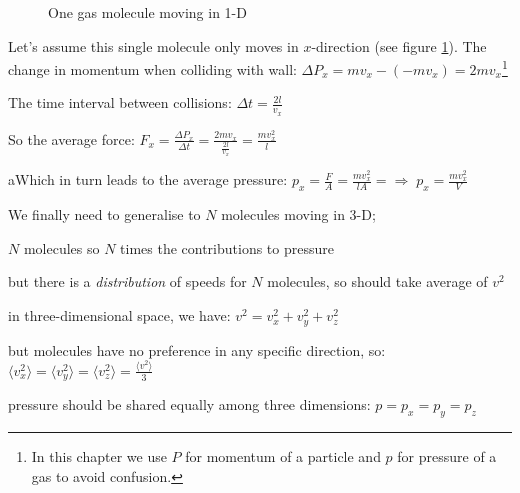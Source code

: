 \documentclass[a4paper,12pt]{book}
\newcommand{\avg}[1]{\langle#1\rangle}
\newcommand{\RA}{\Rightarrow\;}
\begin{document}
\begin{figure}[ht]
\centering
{}

\caption{One gas molecule moving in 1-D}
\label{onedmol}
\end{figure}

Let's assume this single molecule only moves in $x$-direction (see figure \ref{onedmol}). The change in momentum when colliding with wall: $\Delta P_x = mv_x - (-mv_x) = 2mv_x$\footnote{In this chapter we use $P$ for momentum of a particle and $p$ for pressure of a gas to avoid confusion.}

The time interval between collisions: $\Delta t=\frac{2l}{v_x}$

So the average force: $F_x=\frac{\Delta P_x}{\Delta t} = \frac{2mv_x}{\tfrac{2l}{v_x}} = \frac{mv_x^2}{l}$

aWhich in turn leads to the average pressure: $p_x=\frac{F}{A} = \frac{mv_x^2}{lA} = \RA p_x = \frac{mv_x^2}{V}$

We finally need to generalise to $N$ molecules moving in 3-D;

\begin{compactitem}
	\item[--] $N$ molecules so $N$ times the contributions to pressure
	
	but there is a \emph{distribution} of speeds for $N$ molecules, so should take average of $v^2$
	
	\item[--] in three-dimensional space, we have: $v^2=v_x^2 + v_y^2 + v_z^2$
	
	but molecules have no preference in any specific direction, so: $\avg{v_x^2} = \avg{v_y^2} = \avg{v_z^2} = \frac{\avg{v^2}}{3}$
	
	pressure should be shared equally among three dimensions: $p=p_x=p_y=p_z$
		
\end{compactitem}
\end{document}

